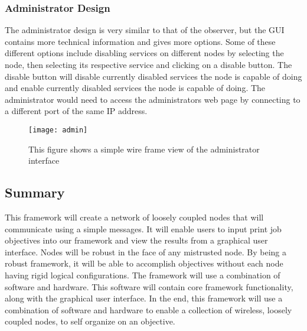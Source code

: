 \subsubsection{Administrator Design}
The administrator design is very similar to that of the observer, but the GUI contains more technical information and gives more options. Some of these different options include disabling services on different nodes by selecting the node, then selecting its respective service and clicking on a disable button. The disable button will disable currently disabled services the node is capable of doing and enable currently disabled services the node is capable of doing. 
The administrator would need to access the administrators web page by connecting to a different port of the same IP address.  
\begin{figure}[H]
\centering
\texttt{[image: admin]}
\captionsetup{justification=centering}
\caption{This figure shows a simple wire frame view of the administrator interface}
\end{figure}




\subsection{Summary}
This framework will create a network of loosely coupled nodes that will communicate using a simple messages. It will enable users to input print job objectives into our framework and view the results from a graphical user interface. Nodes will be robust in the face of any mistrusted node. By being a robust framework, it will be able to accomplish objectives without each node having rigid logical configurations. The framework will use a combination of software and hardware. This software will contain core framework functionality, along with the graphical user interface. In the end, this framework will use a combination of software and hardware to enable a collection of wireless, loosely coupled nodes, to self organize on an objective.

